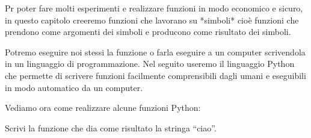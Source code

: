 Pr poter fare molti esperimenti e realizzare funzioni in modo economico e 
sicuro, in questo capitolo creeremo funzioni che lavorano su *simboli* cioè 
funzioni che prendono come argomenti dei simboli e producono come risultato 
dei simboli.

Potremo eseguire noi stessi la funzione o farla eseguire a un computer 
scrivendola in un linguaggio di programmazione. 
Nel seguito useremo il linguaggio Python che permette di scrivere funzioni 
facilmente comprensibili dagli umani e eseguibili in modo automatico da un 
computer.

Vediamo ora come realizzare alcune funzioni Python:

\begin{esempio}
 Scrivi la funzione che dia come risultato la stringa  ``ciao''.
 
\end{esempio}

